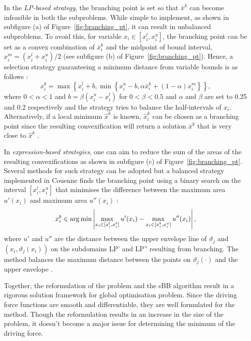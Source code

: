 \begin{enumerate}
\begin{enumerate}
		In the \emph{LP-based strategy}, the branching point is set so that $\bar{x}^k$ can become infeasible in both the subproblems. While simple to implement, as shown in subfigure (a) of Figure~\ref{fig:branching_pt}, it can result in unbalanced subproblems. To avoid this, for variable $x_i \in [x_i^l, x_i^u]$, the branching point can be set as a convex combination of $\bar{x}_i^k$ and the midpoint of bound interval, $x_i^m = (x_i^l + x_i^u) / 2$ (see subfigure (b) of Figure~\ref{fig:branching_pt}). Hence, a selection strategy guaranteeing a minimum distance from variable bounds is as follows \cite{Tawarmalani:2013aa}:
		\[
			x_i^b = \max \left \{x_i^l +b, \min \left \{x_i^u -b, \alpha \bar{x}_i^k + \left(1-\alpha\right)x_i^m \right \} \right \},
		\]
		where $0 < \alpha < 1$ and $b = \beta(x_i^u - x_i^l)$ for $0 < \beta < 0.5$ and $\alpha$ and $\beta$ are set to \num{0.25} and \num{0.2} respectively \cite{Belotti:2009aa} and  the strategy tries to balance the half-intervals of $x_i$. Alternatively, if a local minimum $\hat{x}^k$ is known, $\hat{x}_i^k$ can be chosen as a branching point since the resulting convexification will return a solution $\bar{x}^k$ that is very close to $\hat{x}^k$ \cite{Shectman:1998aa}.
		
	In \emph{expression-based strategies}, one can aim to reduce the sum of the areas of the resulting convexifications as shown in subfigure (c) of Figure~\ref{fig:branching_pt}. Several methods for such strategy can be adopted \cite{Kalantari:1987aa,Liu:1996aa} but a balanced strategy implemented in Couenne finds the branching point using a binary search on the interval $[x_i^l, x_i^u]$ that minimises the difference between the maximum area $u'(x_i)$ and maximum area $u''(x_i)$ \cite{Belotti:2009aa}:
	\[
		x_i^b \in \operatorname*{arg\,min} \left | \max_{x_i \in [x_i^l, x_i^b]} u'(x_i) - \max_{x_i \in [x_i^b, x_i^u]} u''(x_i) \right|,
	\]
	where $u'$ and $u''$ are the distance between the upper envelope line of $\vartheta_j$ and $(x_i, \vartheta_j(x_i))$ on the subdomains LP' and LP'' resulting from branching. The method balances the maximum distance between the points on $\vartheta_j(\cdot)$ and the upper envelope \cite{Belotti:2022aa}.
		\end{enumerate}	
\end{enumerate}

	  Together, the reformulation of the problem and the sBB algorithm result in a rigorous solution framework for global optimisation problem. Since the driving force functions are smooth and differentiable, they are well formulated for the method. Though the reformulation results in an increase in the size of the problem, it doesn't become a major issue for determining the minimum of the driving force.
	  
